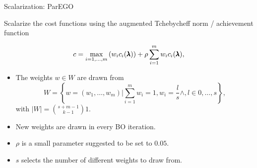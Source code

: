 \begin{frame}{Scalarization: ParEGO~}

    Scalarize the cost functions using the augmented Tchebycheff norm / achievement function

    $$
    c = \max_{i=1,\dots,m}\left(w_i c_i(\pmb{\lambda})\right) + \rho \sum_{i=1}^m w_ic_i(\pmb{\lambda}),
    $$

    \begin{itemize}
        \item The weights $w \in W$ are drawn from
            $$
                W = \left\{ w = (w_1, \dots, w_m) | \sum_{i=1}^m w_i = 1, w_i = \frac{l}{s} \wedge, l \in 0,\dots,s\right\},
            $$
            with $|W| = {{s+m-1}\choose{k-1}}1$.
        \item New weights are drawn in every BO iteration.
        \item $\rho$ is a small parameter suggested to be set to $0.05$.
        \item $s$ selects the number of different weights to draw from.
    \end{itemize}

\end{frame}

